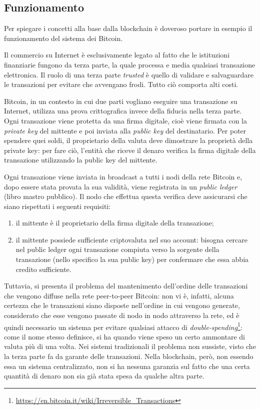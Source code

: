 \subsection{Funzionamento}
\label{c:tec:blockchain:funzionamento}

Per spiegare i concetti alla base dalla blockchain è doveroso portare in esempio il funzionamento del sistema dei Bitcoin.

Il commercio su Internet è esclusivamente legato al fatto che le istituzioni finanziarie fungono da terza parte, la quale processa e media qualsiasi transazione elettronica. Il ruolo di una terza parte \textit{trusted} è quello di validare e salvaguardare le transazioni per evitare che avvengano frodi. Tutto ciò comporta alti costi.

Bitcoin, in un contesto in cui due parti vogliano eseguire una transazione su Internet, utilizza una prova crittografica invece della fiducia nella terza parte. Ogni transazione viene protetta da una firma digitale, cioè viene firmata con la \textit{private key} del mittente e poi inviata alla \textit{public key} del destinatario. Per poter spendere quei soldi, il proprietario della valuta deve dimostrare la proprietà della private key: per fare ciò, l'entità che riceve il denaro verifica la firma digitale della transazione utilizzando la public key del mittente.

Ogni transazione viene inviata in broadcast a tutti i nodi della rete Bitcoin e, dopo essere stata provata la sua validità, viene registrata in un \textit{public ledger} (libro mastro pubblico). Il nodo che effettua questa verifica deve assicurarsi che siano rispettati i seguenti requisiti:
\begin{enumerate}
    \item il mittente è il proprietario della firma digitale della transazione;
    \item il mittente possiede sufficiente criptovaluta nel suo account: bisogna cercare nel public ledger ogni transazione compiuta verso la sorgente della transazione (nello specifico la sua public key) per confermare che essa abbia credito sufficiente.
\end{enumerate}

Tuttavia, si presenta il problema del mantenimento dell'ordine delle transazioni che vengono diffuse nella rete peer-to-peer Bitcoin: non vi è, infatti, alcuna certezza che le transazioni siano disposte nell'ordine in cui vengono generate, considerato che esse vengono passate di nodo in nodo attraverso la rete, ed è quindi necessario un sistema per evitare qualsiasi attacco di \textit{double-spending}\footnote{\url{https://en.bitcoin.it/wiki/Irreversible_Transactions}}: come il nome stesso definisce, si ha quando viene speso un certo ammontare di valuta più di una volta. Nei sistemi tradizionali il problema non sussiste, visto che la terza parte fa da garante delle transazioni. Nella blockchain, però, non essendo essa un sistema centralizzato, non si ha nessuna garanzia sul fatto che una certa quantità di denaro non sia già stata spesa da qualche altra parte.

